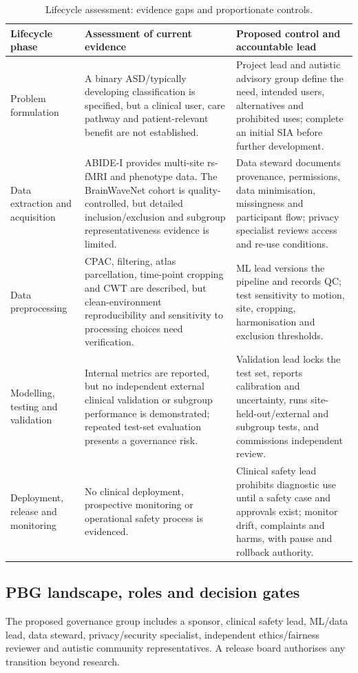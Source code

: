 \documentclass[11pt,a4paper]{article}
\begin{document}
\begin{table}[H]
\centering
\caption{Lifecycle assessment: evidence gaps and proportionate controls.}
\label{tab:lifecycle}
\small
\begin{tabularx}{\textwidth}{p{2.5cm}Y Y}
\toprule
\textbf{Lifecycle phase} & \textbf{Assessment of current evidence} & \textbf{Proposed control and accountable lead}\\
\midrule
Problem formulation & A binary ASD/typically developing classification is specified, but a clinical user, care pathway and patient-relevant benefit are not established. & Project lead and autistic advisory group define the need, intended users, alternatives and prohibited uses; complete an initial SIA before further development.\\
Data extraction and acquisition & ABIDE-I provides multi-site rs-fMRI and phenotype data. The BrainWaveNet cohort is quality-controlled, but detailed inclusion/exclusion and subgroup representativeness evidence is limited. & Data steward documents provenance, permissions, data minimisation, missingness and participant flow; privacy specialist reviews access and re-use conditions.\\
Data preprocessing & CPAC, filtering, atlas parcellation, time-point cropping and CWT are described, but clean-environment reproducibility and sensitivity to processing choices need verification. & ML lead versions the pipeline and records QC; test sensitivity to motion, site, cropping, harmonisation and exclusion thresholds.\\
Modelling, testing and validation & Internal metrics are reported, but no independent external clinical validation or subgroup performance is demonstrated; repeated test-set evaluation presents a governance risk. & Validation lead locks the test set, reports calibration and uncertainty, runs site-held-out/external and subgroup tests, and commissions independent review.\\
Deployment, release and monitoring & No clinical deployment, prospective monitoring or operational safety process is evidenced. & Clinical safety lead prohibits diagnostic use until a safety case and approvals exist; monitor drift, complaints and harms, with pause and rollback authority.\\
\bottomrule
\end{tabularx}
\end{table}

\subsection{PBG landscape, roles and decision gates}
The proposed governance group includes a sponsor, clinical safety lead, ML/data lead, data steward, privacy/security specialist, independent ethics/fairness reviewer and autistic community representatives. A release board authorises any transition beyond research.
\end{document}
